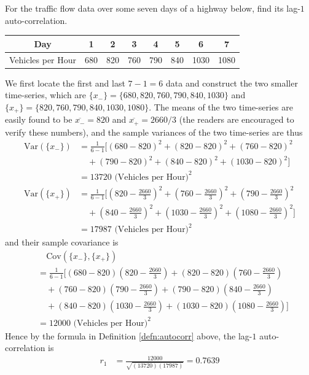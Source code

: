\begin{exmp}
For the traffic flow data over some seven days of a highway below, find its lag-$1$ auto-correlation.
\begin{center}
\begin{tabular}{|c|c|c|c|c|c|c|c|}
\hline
Day & 1 & 2 & 3 & 4 & 5 & 6 & 7 \\
\hline
Vehicles per Hour & 680 & 820 & 760 & 790 & 840 & 1030 & 1080 \\
\hline
\end{tabular}
\end{center}
\end{exmp}
We first locate the first and last $7-1 = 6$ data and construct the two smaller time-series, which are $\{x_-\} = \{680, 820, 760, 790, 840, 1030\}$ and $\{x_+\} = \{820, 760, 790, 840, 1030, 1080\}$. The means of the two time-series are easily found to be $\overline{x_{-}} = 820$ and $\overline{x_{+}} = 2660/3$ (the readers are encouraged to verify these numbers), and the sample variances of the two time-series are thus
\begin{align*}
\text{Var}(\{x_-\}) &= \frac{1}{6-1}[(680 - 820)^2 + (820 - 820)^2 + (760 - 820)^2 \\
& \quad + (790 - 820)^2 + (840 - 820)^2 + (1030 - 820)^2] \\
&=13720 \text{ (Vehicles per Hour)}^2 \\
\text{Var}(\{x_+\}) &= \frac{1}{6-1}[(820 - \frac{2660}{3})^2 + (760 - \frac{2660}{3})^2 + (790 - \frac{2660}{3})^2 \\
&\quad + (840 - \frac{2660}{3})^2 + (1030 - \frac{2660}{3})^2 + (1080 - \frac{2660}{3})^2] \\
&= 17987 \text{ (Vehicles per Hour)}^2
\end{align*}
and their sample covariance is
\begin{align*}
&\quad \text{Cov}(\{x_{-}\},\{x_{+}\}) \\
&= \frac{1}{6-1}[(680 - 820)(820 - \frac{2660}{3}) + (820 - 820)(760 - \frac{2660}{3}) \\
&\quad + (760 - 820)(790 - \frac{2660}{3})  + (790 - 820)(840 - \frac{2660}{3}) \\
&\quad + (840 - 820)(1030 - \frac{2660}{3}) + (1030 - 820)(1080 - \frac{2660}{3})] \\
&= 12000 \text{ (Vehicles per Hour)}^2
\end{align*}
Hence by the formula in Definition \ref{defn:autocorr} above, the lag-$1$ auto-correlation is
\begin{align*}
r_1 &= \frac{12000}{\sqrt{(13720)(17987)}} = 0.7639
\end{align*}
